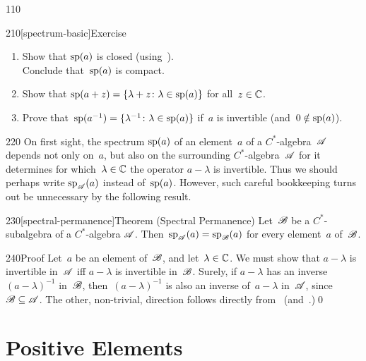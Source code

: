 \begin{parsec}{110}
\begin{point}{210}[spectrum-basic]{Exercise}
\begin{enumerate}
In fact, we will see in~,
that $\|a\|=\sup\{\left|\lambda\right|\colon \lambda\in \spec(a)\}$.
\item
Show that $\mathrm{sp}(a)$ is closed (using~).\\
Conclude that~$\mathrm{sp}(a)$ is compact.
\item
Show that $\mathrm{sp}(a+z)=\{\lambda+z\colon \lambda\in\mathrm{sp}(a)\}$
for all~$z\in \mathbb{C}$.
\item
Prove that~$\mathrm{sp}(a^{-1})=\{\lambda^{-1}\colon \lambda\in \mathrm{sp}(a)\}$
if~$a$ is invertible (and~$0\notin \mathrm{sp}(a)$).
\end{enumerate}%
\spacingfix{}%
\end{point}%
\begin{point}{220}%
On first sight,
the spectrum $\mathrm{sp}(a)$
of an element~$a$ of a $C^*$-algebra~$\mathscr{A}$ 
depends not only on~$a$,
but also on the surrounding $C^*$-algebra~$\mathscr{A}$ for it determines
for which~$\lambda\in\mathbb{C}$ the operator $a-\lambda$ is invertible.
Thus we should perhaps write $\mathrm{sp}_{\mathscr{A}}(a)$ instead
of~$\mathrm{sp}(a)$.
However, such careful bookkeeping turns out 
be unnecessary
by the following result.
\end{point}
\begin{point}{230}[spectral-permanence]{Theorem (Spectral Permanence)}%
%
Let~$\mathscr{B}$ be a $C^*$-subalgebra of a $C^*$-algebra $\mathscr{A}$.
Then~$\mathrm{sp}_{\mathscr{A}}(a)=\mathrm{sp}_{\mathscr{B}}(a)$
for every element~$a$ of~$\mathscr{B}$.
\begin{point}{240}{Proof}%
Let~$a$ be an element of~$\mathscr{B}$,
and let~$\lambda\in \mathbb{C}$.
We must show that $a-\lambda$ is invertible in~$\mathscr{A}$
iff $a-\lambda$ is invertible in~$\mathscr{B}$.
Surely,
if $a-\lambda$ has an inverse $(a-\lambda)^{-1}$ in~$\mathscr{B}$,
then~$(a-\lambda)^{-1}$ is also an inverse of~$a-\lambda$ in~$\mathscr{A}$,
since~$\mathscr{B}\subseteq \mathscr{A}$.
The other, non-trivial, direction follows
    directly from~ 
    (and~.)\qed%
\end{point}
\end{point}
\end{parsec}
\section{Positive Elements}

